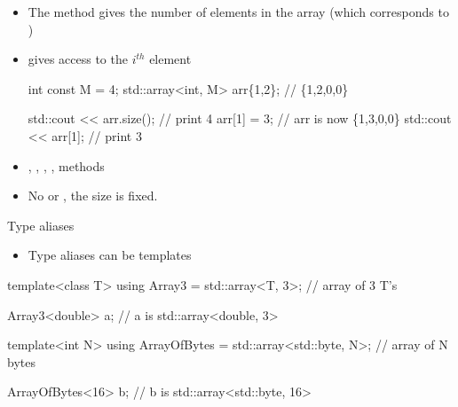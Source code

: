 \begin{frame}[fragile]{ \insertcontinuationtext}

  \begin{itemize}
  \item The  method gives the number of elements in the array (which
    corresponds to )
  \item {} gives access to the $i^{th}$ element
    \begin{codeblock}
int const M = 4;
std::array<int, M> arr\{1,2\}; // \{1,2,0,0\}

std::cout << arr.size(); // print 4
arr[1] = 3;              // arr is now \{1,3,0,0\}
std::cout << arr[1];     // print 3\end{codeblock}

  \item {}, , , ,  methods
  \item No  or , the size is fixed.
  \end{itemize}

\end{frame}

\begin{frame}[fragile]{Type aliases \insertcontinuationtext}

  \begin{itemize}
  \item Type aliases can be templates
  \end{itemize}

  \begin{codeblock}
template<class \alert{T}> using Array3 = std::array<\alert{T}, 3>; // array of 3 T's

Array3<\alert{double}> a; // a is std::array<double, 3>\end{codeblock}

\begin{codeblock}
template<int \alert{N}> using ArrayOfBytes = std::array<std::byte, \alert{N}>; // array of N bytes

ArrayOfBytes<\alert{16}> b; // b is std::array<std::byte, 16>\end{codeblock}
\end{frame}

